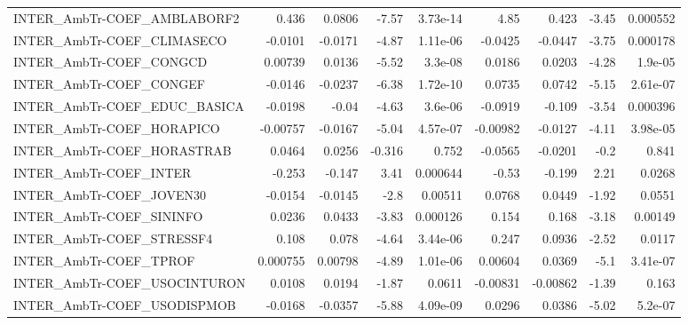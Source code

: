 \begin{tabular}{lrrrrrrrr}
INTER\_AmbTr-COEF\_AMBLABORF2           &       0.436 &       0.0806 &    -7.57 & 3.73e-14 &       4.85 &       0.423 &        -3.45 &      0.000552 \\
INTER\_AmbTr-COEF\_CLIMASECO            &     -0.0101 &      -0.0171 &    -4.87 & 1.11e-06 &    -0.0425 &     -0.0447 &        -3.75 &      0.000178 \\
INTER\_AmbTr-COEF\_CONGCD               &     0.00739 &       0.0136 &    -5.52 &  3.3e-08 &     0.0186 &      0.0203 &        -4.28 &       1.9e-05 \\
INTER\_AmbTr-COEF\_CONGEF               &     -0.0146 &      -0.0237 &    -6.38 & 1.72e-10 &     0.0735 &      0.0742 &        -5.15 &      2.61e-07 \\
INTER\_AmbTr-COEF\_EDUC\_BASICA          &     -0.0198 &        -0.04 &    -4.63 &  3.6e-06 &    -0.0919 &      -0.109 &        -3.54 &      0.000396 \\
INTER\_AmbTr-COEF\_HORAPICO             &    -0.00757 &      -0.0167 &    -5.04 & 4.57e-07 &   -0.00982 &     -0.0127 &        -4.11 &      3.98e-05 \\
INTER\_AmbTr-COEF\_HORASTRAB            &      0.0464 &       0.0256 &   -0.316 &    0.752 &    -0.0565 &     -0.0201 &         -0.2 &         0.841 \\
INTER\_AmbTr-COEF\_INTER                &      -0.253 &       -0.147 &     3.41 & 0.000644 &      -0.53 &      -0.199 &         2.21 &        0.0268 \\
INTER\_AmbTr-COEF\_JOVEN30              &     -0.0154 &      -0.0145 &     -2.8 &  0.00511 &     0.0768 &      0.0449 &        -1.92 &        0.0551 \\
INTER\_AmbTr-COEF\_SININFO              &      0.0236 &       0.0433 &    -3.83 & 0.000126 &      0.154 &       0.168 &        -3.18 &       0.00149 \\
INTER\_AmbTr-COEF\_STRESSF4             &       0.108 &        0.078 &    -4.64 & 3.44e-06 &      0.247 &      0.0936 &        -2.52 &        0.0117 \\
INTER\_AmbTr-COEF\_TPROF                &    0.000755 &      0.00798 &    -4.89 & 1.01e-06 &    0.00604 &      0.0369 &         -5.1 &      3.41e-07 \\
INTER\_AmbTr-COEF\_USOCINTURON          &      0.0108 &       0.0194 &    -1.87 &   0.0611 &   -0.00831 &    -0.00862 &        -1.39 &         0.163 \\
INTER\_AmbTr-COEF\_USODISPMOB           &     -0.0168 &      -0.0357 &    -5.88 & 4.09e-09 &     0.0296 &      0.0386 &        -5.02 &       5.2e-07 \\

\end{tabular}
